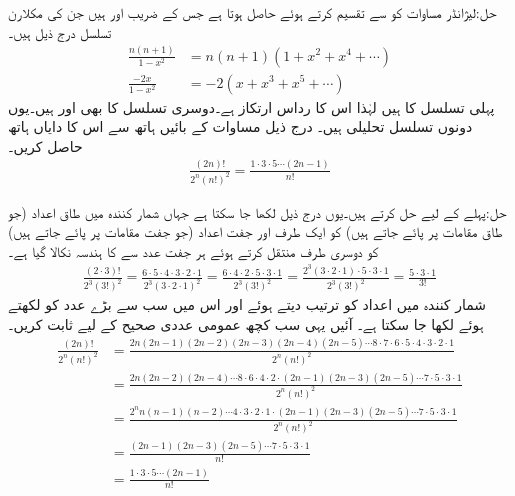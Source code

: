 حل:لیژانڈر مساوات کو  سے تقسیم کرتے ہوئے  حاصل ہوتا ہے جس کے  ضریب   اور  ہیں جن کی مکلارن تسلسل درج ذیل ہیں۔
\begin{align*}
\frac{n(n+1)}{1-x^2}&=n(n+1)(1+x^2+x^4+\cdots)\\
\frac{-2x}{1-x^2}&=-2(x+x^3+x^5+\cdots)
\end{align*}
پہلی تسلسل کا  ہیں لہٰذا اس کا رداس ارتکاز  ہے۔دوسری تسلسل کا بھی  اور  ہیں۔یوں دونوں تسلسل تحلیلی ہیں۔
درج ذیل مساوات کے بائیں ہاتھ سے اس کا دایاں ہاتھ حاصل کریں۔
\begin{align*}
\frac{(2n)!}{2^n(n!)^2}=\frac{1\cdot 3\cdot 5\cdots (2n-1)}{n!}
\end{align*}

حل:پہلے   کے لیے حل کرتے ہیں۔یوں درج ذیل لکھا جا سکتا ہے جہاں شمار کنندہ میں طاق اعداد (جو طاق مقامات پر پائے جاتے ہیں) کو ایک طرف اور جفت اعداد (جو جفت مقامات پر پائے جاتے ہیں) کو دوسری طرف منتقل کرتے ہوئے ہر جفت عدد سے  کا ہندسہ نکالا گیا ہے۔ 
\begin{align*}
\frac{(2\cdot 3)!}{2^3(3!)^2}=\frac{6\cdot 5\cdot 4\cdot 3\cdot 2\cdot 1}{2^3(3\cdot 2\cdot 1)^2}=\frac{6\cdot 4\cdot 2\cdot 5\cdot 3\cdot 1}{2^3(3!)^2}=\frac{2^3(3\cdot 2\cdot 1)\cdot 5\cdot 3\cdot 1}{2^3(3!)^2}=\frac{5\cdot 3\cdot 1}{3!}
\end{align*}
شمار کنندہ میں اعداد کو ترتیب دیتے ہوئے اور اس میں سب سے بڑے عدد  کو  لکھتے ہوئے   لکھا جا سکتا ہے۔ آئیں یہی سب کچھ عمومی عددی صحیح  کے لیے ثابت کریں۔
{\small
\begin{align*}
\frac{(2n)!}{2^n(n!)^2}&=\frac{2n(2n-1)(2n-2)(2n-3)(2n-4)(2n-5)\cdots 8\cdot 7\cdot 6\cdot 5 \cdot 4\cdot 3\cdot 2\cdot 1 }{2^n(n!)^2}\\
&=\frac{2n(2n-2)(2n-4)\cdots 8\cdot 6\cdot 4\cdot 2\cdot (2n-1)(2n-3)(2n-5)\cdots 7\cdot 5\cdot 3\cdot 1}{2^n(n!)^2}\\
&=\frac{2^n n(n-1)(n-2)\cdots 4\cdot 3\cdot 2\cdot 1\cdot (2n-1)(2n-3)(2n-5)\cdots 7\cdot 5\cdot 3\cdot 1}{2^n(n!)^2}\\
&=\frac{(2n-1)(2n-3)(2n-5)\cdots 7\cdot 5\cdot 3\cdot 1}{n!}\\
&=\frac{1\cdot 3\cdot 5\cdots (2n-1)}{n!}
\end{align*}
}


